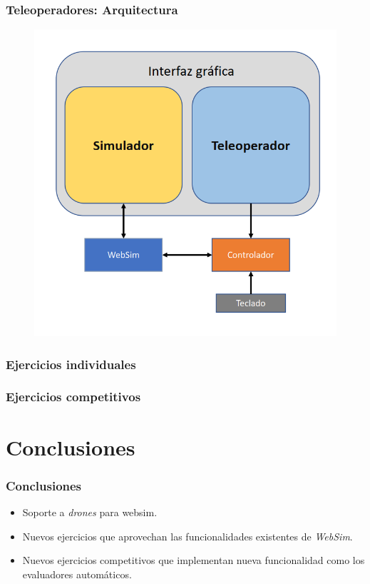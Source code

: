\documentclass[xcolor={table}]{beamer}
\begin{document}
		
		\begin{frame}
			\frametitle{Teleoperadores: Arquitectura}
			\begin{figure}
			    \centering			    \includegraphics[scale=0.45]{img/arquitecturaTeleoperador.png}
			    \label{fig:teleop}
			\end{figure}
			
		\end{frame}

		\begin{frame}
			\frametitle{Ejercicios individuales}
		\end{frame}
		
		\begin{frame}
			\frametitle{Ejercicios competitivos}
		\end{frame}

	\section{Conclusiones}
		\begin{frame}
			\frametitle{Conclusiones}
			\begin{itemize}
				\item Soporte a \textit{drones} para websim. 
				\item Nuevos ejercicios que aprovechan las funcionalidades existentes de \textit{WebSim}.
				\item Nuevos ejercicios competitivos que implementan nueva funcionalidad como los evaluadores automáticos. 
			\end{itemize}
		\end{frame}
	
\end{document}
